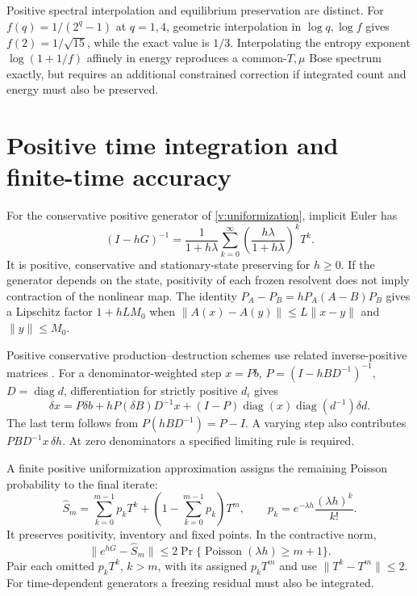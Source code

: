 Positive spectral interpolation and equilibrium preservation are distinct. For
$f(q)=1/(2^q-1)$ at $q=1,4$, geometric interpolation in $\log q,\log f$ gives $f(2)=1/\sqrt{15}$, while the exact value is $1/3$. Interpolating the entropy exponent $\log(1+1/f)$ affinely in energy reproduces a common-$T,\mu$ Bose spectrum exactly, but requires an additional constrained correction if integrated count and energy must also be preserved.

\section{Positive time integration and finite-time accuracy}
\label{v:time_integration}

For the conservative positive generator of \eqref{v:uniformization}, implicit Euler has
\begin{equation}
 (I-hG)^{-1}=\frac1{1+h\lambda}
 \sum_{k=0}^{\infty}\left(\frac{h\lambda}{1+h\lambda}\right)^kT^k .
 \label{v:positive_resolvent}
\end{equation}
It is positive, conservative and stationary-state preserving for $h\ge0$. If the generator depends on the state, positivity of each frozen resolvent does not imply contraction of the nonlinear map. The identity $P_A-P_B=hP_A(A-B)P_B$ gives a Lipschitz factor $1+hLM_0$ when $\|A(x)-A(y)\|\le L\|x-y\|$ and $\|y\|\le M_0$.

Positive conservative production--destruction schemes use related inverse-positive matrices \cite{vBurchard2003,vKopecz2018}. For a denominator-weighted step $x=Pb$, $P=(I-hBD^{-1})^{-1}$, $D=\operatorname{diag}d$, differentiation for strictly positive $d_i$ gives
\begin{equation}
 \delta x=P\delta b+hP(\delta B)D^{-1}x+
 (I-P)\operatorname{diag}(x)\operatorname{diag}(d^{-1})\delta d .
 \label{v:patankar_differential}
\end{equation}
The last term follows from $P(hBD^{-1})=P-I$. A varying step also contributes $PB D^{-1}x\,\delta h$. At zero denominators a specified limiting rule is required.

A finite positive uniformization approximation assigns the remaining Poisson probability to the final iterate:
\begin{equation}
 \widehat S_m=\sum_{k=0}^{m-1}p_kT^k+
 \left(1-\sum_{k=0}^{m-1}p_k\right)T^m,\qquad
 p_k=e^{-\lambda h}\frac{(\lambda h)^k}{k!}.
 \label{v:poisson_closure}
\end{equation}
It preserves positivity, inventory and fixed points. In the contractive norm,
\begin{equation}
 \|e^{hG}-\widehat S_m\|\le
 2\Pr\{\operatorname{Poisson}(\lambda h)\ge m+1\}.
 \label{v:poisson_error}
\end{equation}
Pair each omitted $p_kT^k$, $k>m$, with its assigned $p_kT^m$ and use $\|T^k-T^m\|\le2$. For time-dependent generators a freezing residual must also be integrated.

